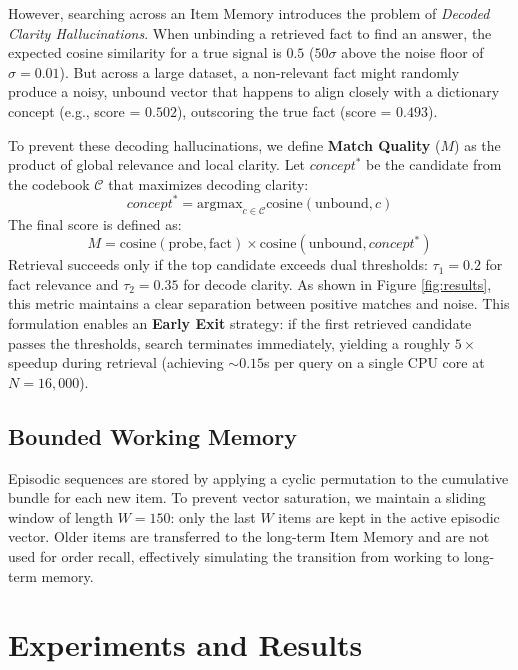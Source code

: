 \documentclass[11pt,letterpaper]{article}
\begin{document}
However, searching across an Item Memory introduces the problem of \textit{Decoded Clarity Hallucinations}. When unbinding a retrieved fact to find an answer, the expected cosine similarity for a true signal is $0.5$ ($50\sigma$ above the noise floor of $\sigma=0.01$). But across a large dataset, a non-relevant fact might randomly produce a noisy, unbound vector that happens to align closely with a dictionary concept (e.g., score = $0.502$), outscoring the true fact (score = $0.493$).

To prevent these decoding hallucinations, we define \textbf{Match Quality} ($M$) as the product of global relevance and local clarity. Let $concept^*$ be the candidate from the codebook $\mathcal{C}$ that maximizes decoding clarity:
\begin{equation}
    concept^* = \text{argmax}_{c \in \mathcal{C}} \text{cosine}(\text{unbound}, c)
\end{equation}
The final score is defined as:
\begin{equation}
    M = \text{cosine}(\text{probe}, \text{fact}) \times \text{cosine}(\text{unbound}, concept^*)
\end{equation}
Retrieval succeeds only if the top candidate exceeds dual thresholds: $\tau_1 = 0.2$ for fact relevance and $\tau_2 = 0.35$ for decode clarity. As shown in Figure \ref{fig:results}, this metric maintains a clear separation between positive matches and noise. This formulation enables an \textbf{Early Exit} strategy: if the first retrieved candidate passes the thresholds, search terminates immediately, yielding a roughly $5\times$ speedup during retrieval (achieving $\sim 0.15$s per query on a single CPU core at $N=16,000$).

\subsection{Bounded Working Memory}
Episodic sequences are stored by applying a cyclic permutation to the cumulative bundle for each new item. To prevent vector saturation, we maintain a sliding window of length $W = 150$: only the last $W$ items are kept in the active episodic vector. Older items are transferred to the long-term Item Memory and are not used for order recall, effectively simulating the transition from working to long-term memory.

\section{Experiments and Results}
\label{sec:experiments}
\end{document}
